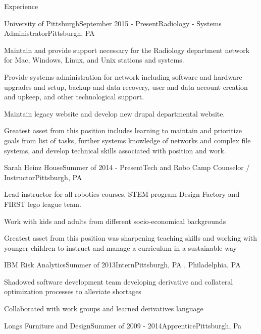 \documentclass{resume} %
\begin{document}
\begin{rSection}{Experience}

\begin{rSubsection}{University of Pittsburgh}{September 2015 - Present}{Radiology - Systems Administrator}{Pittsburgh, PA}
\item Maintain and provide support necessary for the Radiology department network for Mac, Windows, Linux, and Unix stations and systems. 
\item Provide systems administration for network including software and hardware upgrades and setup, backup and data recovery, user and data account creation and upkeep, and other technological support.
\item Maintain legacy website and develop new drupal departmental website.
\item Greatest asset from this position includes learning to maintain and prioritize goals from list of tasks, further systems knowledge of networks and complex file systems, and develop technical skills associated with position and work.
\end{rSubsection}
\begin{rSubsection}{Sarah Heinz House}{Summer of 2014 - Present}{Tech and Robo Camp Counselor / Instructor}{Pittsburgh, PA}
\item Lead instructor for all robotics courses, STEM program Design Factory and FIRST lego league team.
\item Work with kids and adults from different socio-economical backgrounds
\item Greatest asset from this position was sharpening teaching skills and working with younger children to instruct and manage a curriculum in a sustainable way
\end{rSubsection}
\begin{rSubsection}{IBM Risk Analytics}{Summer of 2013}{Intern}{Pittsburgh, PA , Philadelphia, PA}
\item Shadowed software development team developing derivative and collateral optimization processes to alleviate shortages
\item Collaborated with work groups and learned derivatives language
\end{rSubsection}
\begin{rSubsection}{Longs Furniture and Design}{Summer of 2009 - 2014}{Apprentice}{Pittsburgh, Pa}

\end{rSubsection}
\end{rSection}
\end{document}
